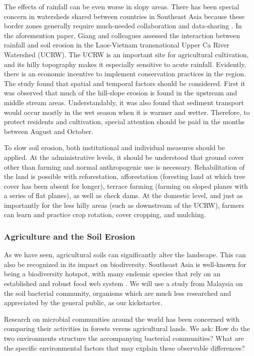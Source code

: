 The effects of rainfall can be even worse in slopy areas. There has been special concern in watersheds shared between countries in Southeast Asia because these border zones generally require much-needed collaboration and data-sharing \citep{giang2017spatial}. In the aforemention paper, Giang and colleagues assessed the interaction between rainfall and soil erosion in the Laos-Vietnam transnational Upper Ca River Watershed (UCRW). The UCRW is an important site for agricultural cultivation, and its hilly topography makes it especially sensitive to acute rainfall. Evidently, there is an economic incentive to implement conservation practices in the region. The study found that spatial and temporal factors should be considered. First it was observed that much of the hill-slope erosion is found in the upstream and middle stream areas. Understandably, it was also found that sediment transport would occur mostly in the wet season when it is warmer and wetter. Therefore, to protect residents and cultivation, special attention should be paid in the months between August and October. 

To slow soil erosion, both institutional and individual measures should be applied. At the administrative levels, it should be understood that ground cover other than farming and normal anthropogenic use is necessary. Rehabilitation of the land is possible with reforestation, afforestation (foresting land at which tree cover has been absent for longer), terrace farming (farming on sloped planes with a series of flat planes), as well as check dams. At the domestic level, and just as importantly for the less hilly areas (such as downstream of the UCRW), farmers can learn and practice crop rotation, cover cropping, and mulching.

\subsubsection{Agriculture and the Soil Erosion}

As we have seen, agricultural soils can significantly alter the landscape. This can also be recognized in its impact on biodiversity. Southeast Asia is well-known for being a biodiversity hotspot, with many endemic species that rely on an established and robust food web system \citep{tripathi2012tropical}. We will use a study from Malaysia on the soil bacterial community, organisms which are much less researched and appreciated by the general public, as our kickstarter. 

Research on microbial communities around the world has been concerned with comparing their activities in forests versus agricultural lands. We ask: How do the two environments structure the accompanying bacterial communities?  What are the specific environmental factors that may explain these observable differences?

